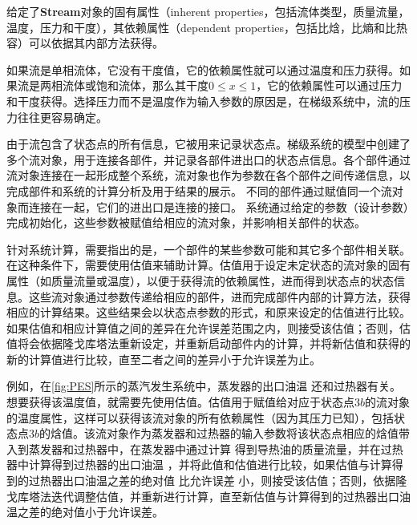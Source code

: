 给定了\textbf{Stream}对象的固有属性（inherent properties，包括流体类型，质量流量，温度，压力和干度），其依赖属性（dependent properties，包括比焓，比熵和比热容）可以依据其内部方法获得。

如果流是单相流体，它没有干度值，它的依赖属性就可以通过温度和压力获得。如果流是两相流体或饱和流体，那么其干度$0 \leqslant x \leqslant 1$，它的依赖属性可以通过压力和干度获得。选择压力而不是温度作为输入参数的原因是，在梯级系统中，流的压力往往更容易确定。

由于流包含了状态点的所有信息，它被用来记录状态点。梯级系统的模型中创建了多个流对象，用于连接各部件，并记录各部件进出口的状态点信息。各个部件通过流对象连接在一起形成整个系统，流对象也作为参数在各个部件之间传递信息，以完成部件和系统的计算分析及用于结果的展示。
不同的部件通过赋值同一个流对象而连接在一起，它们的进出口是连接的接口。
系统通过给定的参数（设计参数）完成初始化，这些参数被赋值给相应的流对象，并影响相关部件的状态。

针对系统计算，需要指出的是，一个部件的某些参数可能和其它多个部件相关联。
在这种条件下，需要使用估值来辅助计算。估值用于设定未定状态的流对象的固有属性（如质量流量或温度），以便于获得流的依赖属性，进而得到状态点的状态信息。这些流对象通过参数传递给相应的部件，进而完成部件内部的计算方法，获得相应的计算结果。这些结果会以状态点参数的形式，和原来设定的估值进行比较。如果估值和相应计算值之间的差异在允许误差范围之内，则接受该估值；否则，估值将会依据隆戈库塔法重新设定，并重新启动部件内的计算，并将新估值和获得的新的计算值进行比较，直至二者之间的差异小于允许误差为止。

例如，在\autoref{fig:PES}所示的蒸汽发生系统中，蒸发器的出口油温%
还和过热器有关。想要获得该温度值，就需要先使用估值。估值用于赋值给对应于状态点$3b$的流对象的温度属性，这样可以获得该流对象的所有依赖属性（因为其压力已知），包括状态点$3b$的焓值。该流对象作为蒸发器和过热器的输入参数将该状态点相应的焓值带入到蒸发器和过热器中，在蒸发器中通过计算
得到导热油的质量流量，并在过热器中计算得到过热器的出口油温
，并将此值和估值进行比较，如果估值与计算得到的过热器出口油温之差的绝对值
比允许误差
小，则接受该估值；否则，依据隆戈库塔法迭代调整估值，并重新进行计算，直至新估值与计算得到的过热器出口油温之差的绝对值小于允许误差。

